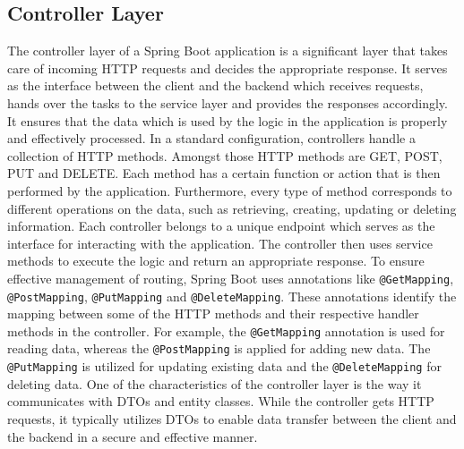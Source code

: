     \subsection{Controller Layer}
    The controller layer of a Spring Boot application is a significant layer that takes care of incoming HTTP requests and decides the appropriate response. It serves as the interface between the client and the backend which receives requests, hands over the tasks to the service layer and provides the responses accordingly. It ensures that the data which is used by the logic in the application is properly and effectively processed. \newline
    In a standard configuration, controllers handle a collection of HTTP methods. Amongst those HTTP methods are GET, POST, PUT and DELETE. Each method has a certain function or action that is then performed by the application. Furthermore, every type of method corresponds to different operations on the data, such as retrieving, creating, updating or deleting information. Each controller belongs to a unique endpoint which serves as the interface for interacting with the application. The controller then uses service methods to execute the logic and return an appropriate response. \newline
    To ensure effective management of routing, Spring Boot uses annotations like \texttt{@GetMapping}, \texttt{@PostMapping}, \texttt{@PutMapping} and \texttt{@DeleteMapping}. These annotations identify the mapping between some of the HTTP methods and their respective handler methods in the controller. For example, the \texttt{@GetMapping} annotation is used for reading data, whereas the \texttt{@PostMapping} is applied for adding new data. The \texttt{@PutMapping} is utilized for updating existing data and the \texttt{@DeleteMapping} for deleting data. \newline
    One of the characteristics of the controller layer is the way it communicates with DTOs and entity classes. While the controller gets HTTP requests, it typically utilizes DTOs to enable data transfer between the client and the backend in a secure and effective manner.


